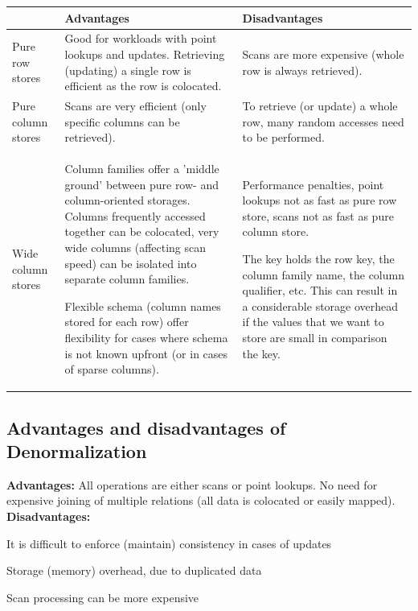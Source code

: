 \documentclass[11pt,oneside,a4paper]{article}
\begin{document}
\begin{table}[hb!]
\begin{tabular}{|p{15mm}|p{80mm}|p{80mm}|}
	\hline 
	& \textbf{Advantages} & \textbf{Disadvantages} \\ 
	\hline 
	Pure row stores & Good for workloads with point lookups and updates. Retrieving (updating) a single row is efficient as the row is colocated. & Scans are more expensive (whole row is always retrieved). \\ 
	\hline 
	Pure column stores & Scans are very efficient (only specific columns can be retrieved). & To retrieve (or update) a whole row, many random accesses need to be performed. \\ 
	\hline 
	Wide column stores & 
	\begin{compactitem}
		\item Column families offer a 'middle ground' between pure row- and column-oriented storages. Columns frequently accessed together can be colocated, very wide columns (affecting scan speed) can be isolated into separate column families.
		\item Flexible schema (column names stored for each row) offer flexibility for cases where schema is not known upfront (or in cases of sparse columns).
	\end{compactitem}  & 
	\begin{compactitem}
		\item Performance penalties, point lookups not as fast as pure row store, scans not as fast as pure column store.
		\item The key holds the row key, the column family name, the column qualifier, etc. This can result in a considerable storage
		overhead if the values that we want to store are small in comparison the key.
	\end{compactitem}\\
	\hline 
\end{tabular} 
\end{table}

\subsection{Advantages and disadvantages of Denormalization}

\textbf{Advantages:} All operations are either scans or point lookups. No need for expensive joining of multiple relations (all data is colocated or easily mapped).\\

\textbf{Disadvantages:}
\begin{compactitem}
\item It is difficult to enforce (maintain) consistency in cases of updates
\item Storage (memory) overhead, due to duplicated data
\item Scan processing can be more expensive 
\end{compactitem}
\end{document}

